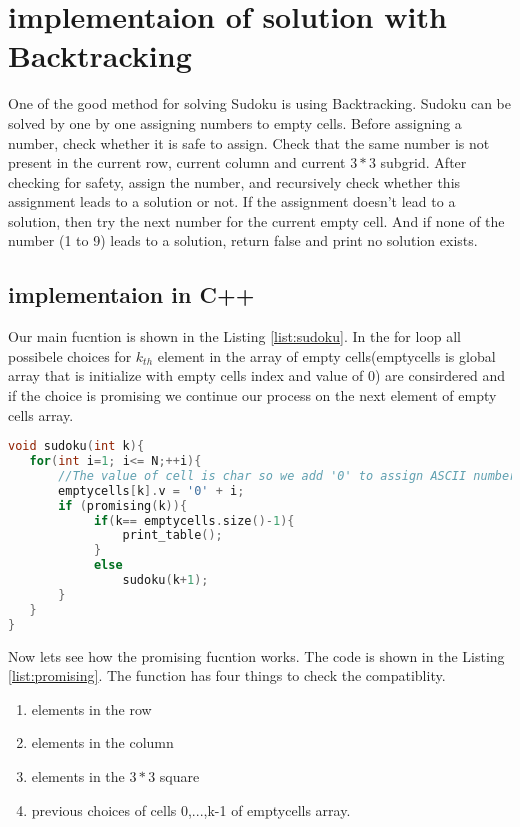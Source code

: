 \section{implementaion of solution with Backtracking}
One of the good method for solving Sudoku is using Backtracking.
Sudoku can be solved by one by one assigning 
numbers to empty cells. Before assigning a 
number, check whether it is safe to assign. 
Check that the same number is not present in 
the current row, current column and current $3*3$
subgrid. After checking for safety, assign the 
number, and recursively check whether this assignment 
leads to a solution or not. If the assignment 
doesn’t lead to a solution, then try the next 
number for the current empty cell. And if none 
of the number (1 to 9) leads to a solution, 
return false and print no solution exists.

\subsection{implementaion in C++}
Our main fucntion is shown in the Listing \ref{list:sudoku}.
In the for loop all possibele choices for $k_{th}$ element in the
array of empty cells(emptycells is global array that is initialize with empty cells index and value of 0) are consirdered and if the choice is promising
we continue our process on the next element of empty cells array.
\begin{lstlisting}[style=mystyle,
language=C++, 
caption=main recursive function for implementing backtracking,
label=list:sudoku]
void sudoku(int k){
   for(int i=1; i<= N;++i){
       //The value of cell is char so we add '0' to assign ASCII number
       emptycells[k].v = '0' + i;
       if (promising(k)){
            if(k== emptycells.size()-1){ 
                print_table();
            }
            else
                sudoku(k+1);
       } 
   } 
}
\end{lstlisting}

Now lets see how the promising fucntion works. The code is
shown in the Listing \ref{list:promising}. The function has
four things to check the compatiblity.
\begin{enumerate}
  \item elements in the row
  \item elements in the column
  \item elements in the $3*3$ square
  \item previous choices of cells 0,...,k-1 of emptycells array.
\end{enumerate}

